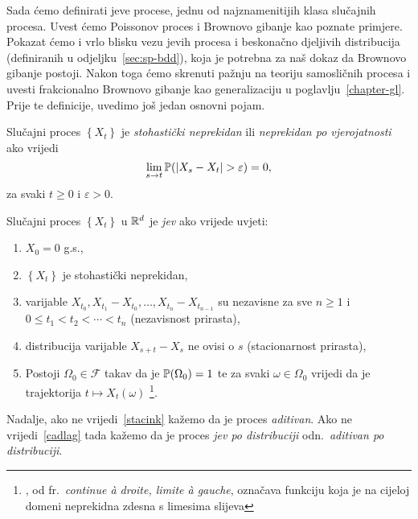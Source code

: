 \documentclass[main.tex]{subfiles}
\begin{document}
Sada ćemo definirati \levy jeve procese, jednu od najznamenitijih klasa slučajnih procesa. Uvest ćemo Poissonov proces
i Brownovo gibanje kao poznate primjere. Pokazat ćemo i vrlo blisku vezu \levy jevih procesa i beskonačno djeljivih distribucija (definiranih u odjeljku~\ref{sec:sp-bdd}), koja
je potrebna za naš dokaz da Brownovo gibanje postoji. Nakon toga ćemo skrenuti pažnju na teoriju samosličnih procesa i uvesti
frakcionalno Brownovo gibanje kao generalizaciju u poglavlju~\ref{chapter-gl}. Prije te definicije, uvedimo još jedan osnovni pojam.

\begin{definicija}
	Slučajni proces \( \left\{ X_t \right\} \) je \emph{stohastički neprekidan} ili \emph{neprekidan po vjerojatnosti} ako vrijedi
	\begin{equation} \label{def:stohnep}
		\lim\limits_{s \rightarrow t} \P (\abs{X_s - X_t} > \varepsilon)  = 0,
	\end{equation}
	za svaki \( t \ge 0 \) i \( \varepsilon > 0 \).
\end{definicija}

\begin{definicija}
	Slučajni proces \( \left\{ X_t \right\} \) u \( \R^d \) je \emph{\levy jev} ako vrijede uvjeti:
	\begin{enumerate}[label=(\roman*)]
		\item \( X_0 = 0 \) g.s.,
		\item \( \left\{ X_t \right\} \) je stohastički neprekidan,
		\item varijable \( X_{t_0}, X_{t_1}-X_{t_0}, \ldots ,X_{t_n}-X_{t_{n-1}} \) su nezavisne za sve \( n \ge 1 \) i \(0 \le t_1 < t_2 < \cdots < t_n \) (nezavisnost prirasta),
		\item distribucija varijable \( X_{s+t}-X_s \) ne ovisi o \( s \) (stacionarnost prirasta), \label{stacink}
		\item Postoji \( \Omega_0 \in \mathcal F \) takav da je \( \P(\Omega_0) = 1 \) te za svaki \( \omega \in \Omega_0 \) vrijedi da je trajektorija
		      \( t \mapsto X_t(\omega) \) \cadlag\footnote{\cadlag, od fr.\ \textit{continue à droite, limite à gauche}, označava funkciju koja je na cijeloj domeni neprekidna zdesna s limesima slijeva}. \label{cadlag}
	\end{enumerate}
	Nadalje, ako ne vrijedi~\ref{stacink} kažemo da je proces \emph{aditivan}. Ako ne vrijedi~\ref{cadlag} tada kažemo da je proces \emph{\levy jev po distribuciji} odn.\
	\emph{aditivan po distribuciji}.
\end{definicija}
\end{document}
